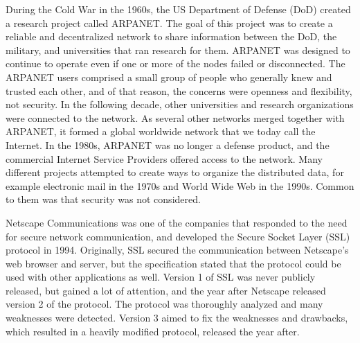 \documentclass[12pt,a4paper,titlepage]{report}
\begin{document}
During the Cold War in the 1960s, the US Department of Defense (DoD) created a research project called ARPANET. The goal of this project was to create a reliable and decentralized network to share information between the DoD, the military, and universities that ran research for them. ARPANET was designed to continue to operate even if one or more of the nodes failed or disconnected. The ARPANET users comprised a small group of people who generally knew and trusted each other, and of that reason, the concerns were openness and flexibility, not security. In the following decade, other universities and research organizations were connected to the network. As several other networks merged together with ARPANET, it formed a global worldwide network that we today call the Internet. In the 1980s, ARPANET was no longer a defense product, and the commercial Internet Service Providers offered access to the network. Many different projects attempted to create ways to organize the distributed data, for example electronic mail in the 1970s and World Wide Web in the 1990s. Common to them was that security was not considered. \cite{sim97, weinstein05}

Netscape Communications was one of the companies that responded to the need for secure network communication, and developed the Secure Socket Layer (SSL) protocol in 1994. Originally, SSL secured the communication between Netscape's web browser and server, but the specification stated that the protocol could be used with other applications as well. Version 1 of SSL was never publicly released, but gained a lot of attention, and the year after Netscape released version 2 of the protocol. The protocol was thoroughly analyzed and many weaknesses were detected. Version 3 aimed to fix the weaknesses and drawbacks, which resulted in a heavily modified protocol, released the year after. \cite{ibmssl,sansinstitute,morrissey}
\end{document}
